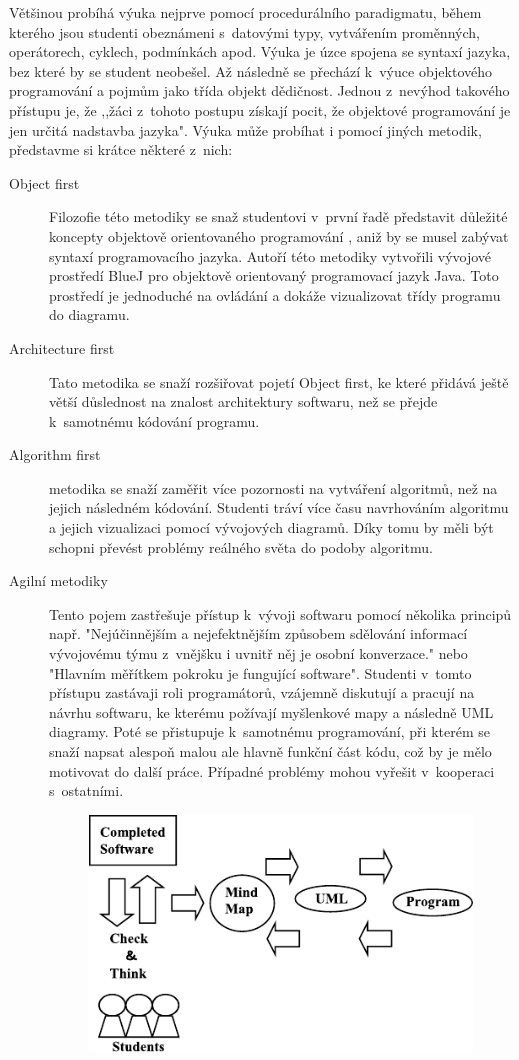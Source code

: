 \documentclass[FP,DP]{tulthesis}
\begin{document}
{{{{{{{Většinou probíhá výuka nejprve pomocí procedurálního paradigmatu, během kterého jsou studenti obeznámeni s~datovými typy, vytvářením proměnných, operátorech, cyklech, podmínkách apod. Výuka je úzce spojena se syntaxí jazyka, bez které by se student neobešel.  Až následně se přechází k~výuce objektového programování a pojmům jako třída objekt dědičnost. Jednou z~nevýhod takového přístupu je, že ,,žáci z~tohoto postupu získají pocit, že objektové programování je jen určitá nadstavba jazyka".  \citep{fojtik2013}
Výuka může probíhat i pomocí jiných metodik, představme si krátce některé z~nich:
\begin{description}
\item [Object first] Filozofie této metodiky se snaž studentovi v~první řadě představit důležité koncepty objektově orientovaného programování , aniž by se musel zabývat syntaxí programovacího jazyka. Autoří této metodiky vytvořili vývojové prostředí BlueJ pro objektově  orientovaný programovací jazyk Java. Toto prostředí je jednoduché na ovládání a dokáže vizualizovat třídy programu do diagramu.
\item [Architecture first] Tato metodika se snaží rozšiřovat pojetí Object first, ke které přidává ještě větší důslednost na znalost architektury softwaru, než se přejde k~samotnému kódování programu.
\item [Algorithm first]metodika se snaží zaměřit více pozornosti na vytváření algoritmů, než na jejich následném kódování. Studenti tráví více času navrhováním algoritmu a jejich vizualizaci pomocí vývojových diagramů. Díky tomu by měli být schopni převést problémy reálného světa do podoby algoritmu.
\item [Agilní metodiky] Tento pojem zastřešuje přístup k~vývoji softwaru pomocí několika principů např. "Nejúčinnějším a nejefektnějším způsobem sdělování informací vývojovému týmu z~vnějšku i uvnitř něj je osobní konverzace." nebo "Hlavním měřítkem pokroku je fungující software". Studenti v~tomto přístupu zastávaji roli programátorů, vzájemně diskutují a pracují na návrhu softwaru, ke kterému požívají myšlenkové mapy a následně UML diagramy. Poté se přistupuje k~samotnému programování, při kterém se snaží napsat alespoň malou ale hlavně funkční část kódu, což by je mělo motivovat do další práce. Případné problémy mohou vyřešit v~kooperaci s~ostatními.
\begin{figure}[ht]
    \centering
    \includegraphics[scale=1.2]{agile.pdf}

\end{figure}
\end{description}}}}}}}}
\end{document}
